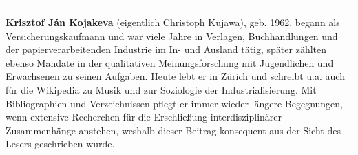 \begin{center}\rule{0.5\linewidth}{\linethickness}\end{center}

\textbf{Krisztof Ján Kojakeva} (eigentlich Christoph Kujawa), geb. 1962,
begann als Versicherungskaufmann und war viele Jahre in Verlagen,
Buchhandlungen und der papierverarbeitenden Industrie im In- und Ausland
tätig, später zählten ebenso Mandate in der qualitativen
Meinungsforschung mit Jugendlichen und Erwachsenen zu seinen Aufgaben.
Heute lebt er in Zürich und schreibt u.a. auch für die Wikipedia zu
Musik und zur Soziologie der Industrialisierung. Mit Bibliographien und
Verzeichnissen pflegt er immer wieder längere Begegnungen, wenn
extensive Recherchen für die Erschließung interdisziplinärer
Zusammenhänge anstehen, weshalb dieser Beitrag konsequent aus der Sicht
des Lesers geschrieben wurde.
